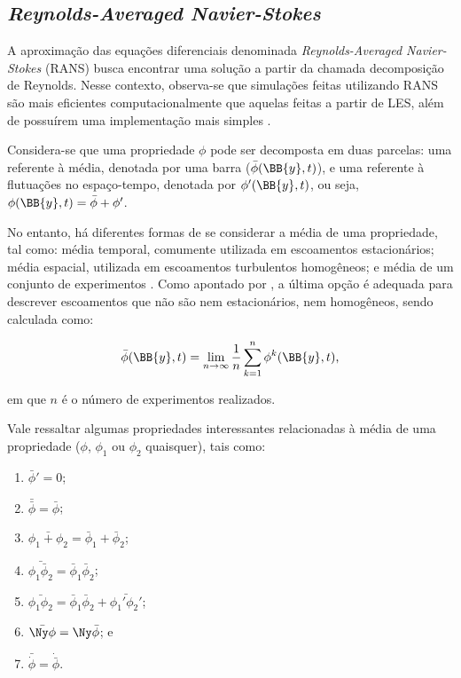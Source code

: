 \subsection{\textit{Reynolds-Averaged Navier-Stokes}} \label{RANS}

A aproximação das equações diferenciais denominada \textit{Reynolds-Averaged Navier-Stokes} (RANS) busca encontrar uma solução a partir da chamada decomposição de Reynolds. Nesse contexto, observa-se que simulações feitas utilizando RANS são mais eficientes computacionalmente que aquelas feitas a partir de LES, além de possuírem uma implementação mais simples \cite{alfonsi2009reynolds, ling2015evaluation}.

Considera-se que uma propriedade $\phi$ pode ser decomposta em duas parcelas: uma referente à média, denotada por uma barra ($\bar{\phi}(\BB{y},t)$), e uma referente à flutuações no espaço-tempo, denotada por $\phi'(\BB{y},t)$, ou seja, $\phi(\BB{y},t)=\bar{\phi}+\phi'$.

No entanto, há diferentes formas de se considerar a média de uma propriedade, tal como: média temporal, comumente utilizada em escoamentos estacionários; média espacial, utilizada em escoamentos turbulentos homogêneos; e média de um conjunto de experimentos \cite{tennekes1972first,speziale1991analytical,alfonsi2009reynolds}. Como apontado por , a última opção é adequada para descrever escoamentos que não são nem estacionários, nem homogêneos, sendo calculada como:

\begin{equation}
    \bar{\phi}(\BB{y},t)=\lim_{n\to\infty}{\frac{1}{n}\sum_{k=1}^n{\phi^{k}(\BB{y},t)}}\text{,}
\end{equation}

\noindent em que $n$ é o número de experimentos realizados.

Vale ressaltar algumas propriedades interessantes relacionadas à média de uma propriedade ($\phi$, $\phi_1$ ou $\phi_2$ quaisquer), tais como:

\begin{enumerate}[label=\alph*.]
    \item $\bar{\phi}'=0$;
    \item $\bar{\bar{\phi}}=\bar{\phi}$;
    \item $\bar{\phi_1+\phi_2}=\bar{\phi}_1+\bar{\phi}_2$;
    \item $\bar{\phi_1\bar{\phi}_2}=\bar{\phi}_1\bar{\phi}_2$;
    \item $\bar{\phi_1\phi_2}=\bar{\phi}_1\bar{\phi}_2+\bar{\phi_1'\phi_2'}$;
    \item $\bar{\Ny\phi}=\Ny\bar{\phi}$; e
    \item $\bar{\dot{\phi}}=\dot{\bar{\phi}}$.
\end{enumerate}

